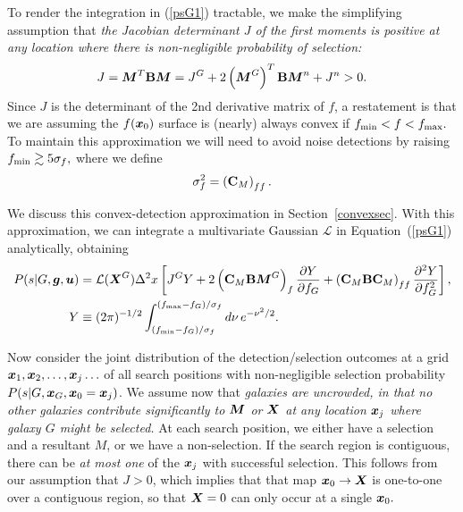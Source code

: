 \documentclass[11pt,preprint,flushrt]{aastex}
\def\eqq#1{Equation~(\ref{#1})}
\newcommand{\vecX}{\mbox{\boldmath $X$}}
\newcommand{\vecg}{\mbox{\boldmath $g$}}
\newcommand{\vecM}{\mbox{\boldmath $M$}}
\newcommand{\vecx}{\mbox{\boldmath $x$}}
\newcommand{\vecu}{\mbox{\boldmath $u$}}
\newcommand{\matC}{\mbox{$\bf C$}}
\newcommand{\matB}{\mbox{$\bf B$}}
\newcommand{\likeli}{\mbox{$\mathcal{L}$}}
\begin{document}
To render the integration in (\ref{psG1}) tractable, we make the
simplifying assumption that \emph{the Jacobian determinant $J$ of the
  first moments is positive at any location where there is
  non-negligible probability of selection:}
\begin{equation}
J = \vecM^T \matB \vecM = J^G + 2\left(\vecM^G\right)^T \matB \vecM^n
+ J^n > 0.
\end{equation}
Since $J$ is the determinant of the 2nd derivative matrix of $f$, a
restatement is that we are assuming the $f(\vecx_0)$ surface is (nearly) always convex if $f_{\rm
  min}<f<f_{\rm max}.$  To maintain this approximation we will need to avoid
noise detections by raising $f_{\rm min}\gtrsim 5\sigma_f,$ where we
define
\begin{equation}
\sigma_f^2 = \left(\matC_M\right)_{ff}.
\label{sigmaf}
\end{equation}

We discuss this convex-detection approximation in Section~\ref{convexsec}.
With this approximation, we can integrate a multivariate Gaussian
$\likeli$ in \eqq{psG1} analytically, obtaining
\begin{align}
\label{psG2}
P(s | G, \vecg, \vecu ) & = \likeli(\vecX^G) \Delta^2 x \left[
 J^G Y + 2\left(\matC_M \matB \vecM^G\right)_f \frac{\partial
  Y}{\partial f_G}
+ \left(\matC_M \matB \matC_M\right)_{ff} 
\frac{\partial^2
  Y}{\partial f_G^2} \right], \\
\label{gaussY}
Y & \equiv (2\pi)^{-1/2} \int_{(f_{\rm min}-f_G)/\sigma_f}^{(f_{\rm
    max}-f_G)/\sigma_f} d\nu\, e^{-\nu^2/2}.
\end{align}

Now consider the joint distribution of the detection/selection
outcomes at a grid $\vecx_1, \vecx_2, \ldots,
\vecx_j \ldots$ of all search positions with non-negligible
selection probability $P(s|G, \vecx_G, \vecx_0=\vecx_j)$.
We assume now that \emph{galaxies are uncrowded, in that
  no other galaxies contribute significantly to $\vecM$ or $\vecX$ at
  any location $\vecx_j$ where galaxy $G$ might be selected.}  At each
search position, we either have a selection and a resultant \vecM, or
we have a non-selection.  If the search region is contiguous, there
can be \emph{at most one} of the
$\vecx_j$ with successful selection.  This follows from our assumption
that $J>0$, which implies that that map $\vecx_0\rightarrow\vecX$ is
one-to-one over a contiguous region, so that 
$\vecX=0$ can only occur at a single $\vecx_0.$
\end{document}
